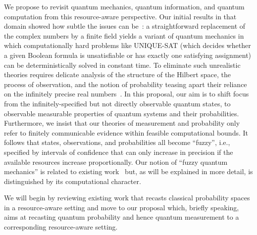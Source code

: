 \documentclass{article}
\theoremstyle{remark}
\begin{document}
We propose to revisit quantum mechanics, quantum information, and
quantum computation from this resource-aware perspective. Our initial
results in that domain showed how subtle the issues can be~\cite{usat}:
a straightforward replacement of the complex numbers by a finite field
yields a variant of quantum mechanics in which computationally hard
problems like UNIQUE-SAT (which decides whether a given Boolean
formula is unsatisfiable or has exactly one satisfying assignment) can
be deterministically solved in constant time. To eliminate such
unrealistic theories requires delicate analysis of the structure of
the Hilbert space, the process of observation, and the notion of
probability teasing apart their reliance on the infinitely precise
real numbers~\cite{geometry2013,DQT2014}. In this proposal, our aim is
to shift focus from the infinitely-specified but not directly
observable quantum states, to observable measurable properties of
quantum systems and their probabilities. Furthermore, we insist that
our theories of measurement and probability only refer to finitely
communicable evidence within feasible computational bounds. It follows
that states, observations, and probabilities all become ``fuzzy'',
i.e., specified by intervals of confidence that can only increase in
precision if the available resources increase proportionally. Our
notion of ``fuzzy quantum mechanics'' is related to existing
work~\cite{GranikCaulfield1996,Pykacz2013,SNL2009,Gudder2005,aerts1993physical}
but, as will be explained in more detail, is distinguished by its
computational character.

We will begin by reviewing existing work that recasts classical
probability spaces in a resource-aware setting and move to our
proposal which, briefly speaking, aims at recasting quantum
probability and hence quantum measurement to a corresponding
resource-aware setting.
\end{document}
